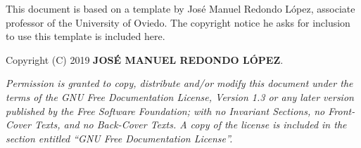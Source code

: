 \documentclass{article}
\begin{document}
This document is based on a template by José Manuel Redondo López, associate
professor of the University of Oviedo. The copyright notice he asks for
inclusion to use this template is included here.

\begin{displayquote}

	Copyright (C) 2019 \textbf{JOSÉ MANUEL REDONDO LÓPEZ}.\cite{plantillaRedondo}

	\textit{Permission is granted to copy, distribute and/or modify this
	document under the terms of the GNU Free Documentation License, Version 1.3
	or any later version published by the Free Software Foundation; with no
	Invariant Sections, no Front- Cover Texts, and no Back-Cover Texts.  A  copy
	of  the license  is  included in  the  section entitled ``GNU  Free
	Documentation License''.}

\end{displayquote}

\clearpage

\tableofcontents







%

%

\printbibliography{}
\end{document}
